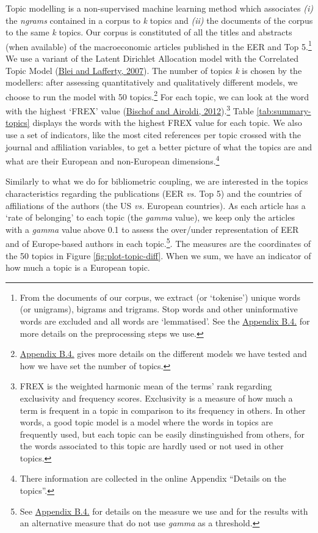 \documentclass[
  12pt,
  onecolumn]{article}
\begin{document}
Topic modelling is a non-supervised machine learning method which
associates \emph{(i)} the \emph{ngrams} contained in a corpus to
\emph{k} topics and \emph{(ii)} the documents of the corpus to the same
\emph{k} topics. Our corpus is constituted of all the titles and
abstracts (when available) of the macroeconomic articles published in
the EER and Top 5.\footnote{From the documents of our corpus, we extract
  (or `tokenise') unique words (or unigrams), bigrams and trigrams. Stop
  words and other uninformative words are excluded and all words are
  `lemmatised'. See the \protect\hyperlink{topic}{Appendix B.4.} for
  more details on the preprocessing steps we use.} We use a variant of
the Latent Dirichlet Allocation model with the Correlated Topic Model
(\protect\hyperlink{ref-blei2007}{Blei and Lafferty, 2007}). The number
of topics \emph{k} is chosen by the modellers: after assessing
quantitatively and qualitatively different models, we choose to run the
model with 50 topics.\footnote{\protect\hyperlink{topic}{Appendix B.4.}
  gives more details on the different models we have tested and how we
  have set the number of topics.} For each topic, we can look at the
word with the highest `FREX' value
(\protect\hyperlink{ref-bischof2012}{Bischof and Airoldi,
2012}).\footnote{FREX is the weighted harmonic mean of the terms' rank
  regarding exclusivity and frequency scores. Exclusivity is a measure
  of how much a term is frequent in a topic in comparison to its
  frequency in others. In other words, a good topic model is a model
  where the words in topics are frequently used, but each topic can be
  easily dinstinguished from others, for the words associated to this
  topic are hardly used or not used in other topics.} Table
\ref{tab:summary-topics} displays the words with the highest FREX value
for each topic. We also use a set of indicators, like the most cited
references per topic crossed with the journal and affiliation variables,
to get a better picture of what the topics are and what are their
European and non-European dimensions.\footnote{There information are
  collected in the online Appendix ``Details on the topics''.}

Similarly to what we do for bibliometric coupling, we are interested in
the topics characteristics regarding the publications (EER \emph{vs.}
Top 5) and the countries of affiliations of the authors (the US
\emph{vs.} European countries). As each article has a `rate of
belonging' to each topic (the \emph{gamma} value), we keep only the
articles with a \emph{gamma} value above 0.1 to assess the over/under
representation of EER and of Europe-based authors in each
topic.\footnote{See \protect\hyperlink{topic}{Appendix B.4.} for details
  on the measure we use and for the results with an alternative measure
  that do not use \emph{gamma} as a threshold.}. The measures are the
coordinates of the 50 topics in Figure \ref{fig:plot-topic-diff}. When
we sum, we have an indicator of how much a topic is a European topic.
\end{document}
